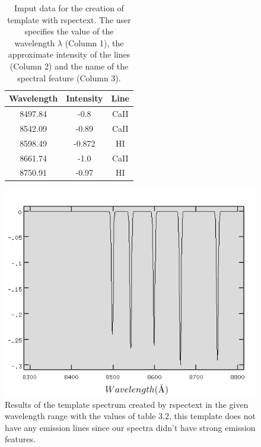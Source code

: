 \begin{figure}[H]
  \centering
  \begin{minipage}[b]{0.5\textwidth}
\begin{table}[H]
\begin{center}
  \begin{tabular}{| c|  c|  c| }
    \hline
    Wavelength & Intensity & Line \\ \hline
    8497.84 & -0.8 & CaII \\ \hline
    8542.09 & -0.89 & CaII \\ \hline 
    8598.49 & -0.872 & HI \\ \hline 
    8661.74 & -1.0 & CaII \\ \hline
    8750.91 & -0.97 & HI \\
    \hline
  \end{tabular} 
    \end{center}
\caption[Imput data for the creation of template with rspectext]{Imput data for the creation of template with rspectext. The user specifies the value of the wavelength $\lambda$ (Column 1), the approximate intensity of the lines (Column 2) and the name of the spectral feature (Column 3).}
\end{table}
  \hfill
    \end{minipage}
  \begin{minipage}[b]{0.49\textwidth}
    \includegraphics[width=\textwidth]{images/template.png}
    \caption[Results of the template spectrum created by rspectext]{Results of the template spectrum created by rspectext in the given wavelength range with the values of table 3.2, this template does not have any emission lines since our spectra didn't have strong emission features.}
  \end{minipage}
\end{figure}

